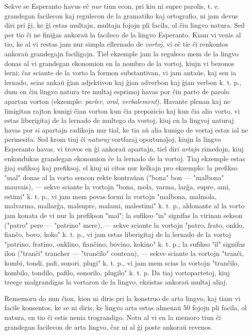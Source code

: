    Sekve se Esperanto havus e\^c {\sl nur} tiun econ, pri kiu ni supre
parolis, t. e. grandegan facilecon kaj regulecon de la gramatiko kaj
ortografio, ni jam devus diri pri \^gi, ke \^gi estas multajn,
multajn fojojn pli facila, ol \^ciu lingvo natura. Sed per tio \^ci
ne fini\^gas ankora\u u la facileco de la lingvo Esperanto. Kiam vi
venis al tio, ke al vi restas jam nur simpla ellernado de {\sl
vortoj}, vi e\^c tie \^ci renkontos ankora\u u grandegajn
faciligojn. Tiel ekzemple jam la reguleco mem de la lingvo donas al
vi grandegan ekonomion en la nombro de la vortoj, kiujn vi bezonos
lerni; \^car sciante de la vorto la formon substantivan, vi jam
anta\u ue, kaj sen ia lernado, scias anka\u u \^gian adjektivon kaj
\^gian adverbon kaj \^gian verbon k. t. p., dum en \^ciu lingvo
natura tre multaj esprimoj havas por \^ciu parto de parolo apartan
vorton (ekzemple: {\sl parler}, {\sl oral}, {\sl verbalement}).
Havante plenan kaj ne limigitan rajton kunigi \^cian vorton kun
\^cia prepozicio kaj kun \^cia alia vorto, vi estas liberigitaj de
la lernado de multego da vortoj, kiuj en la lingvoj naturaj havas
por si apartajn radikojn nur tial, ke tia a\u u alia kunigo de
vortaj estas ial ne permesita. Sed krom tiuj \^ci {\sl naturaj}
vortfaraj oportuna\^{\j}oj, kiujn la lingvo Esperanto havas, vi
trovos en \^gi ankora\u u apartajn, tiel diri {\sl artajn} rimedojn,
kiuj enkondukas grandegan ekonomion \^ce la lernado de la vortoj.
Tiaj ekzemple estas \^giaj sufiksoj kaj prefiksoj, el kiuj ni citos
nur kelkajn pro ekzemplo: la prefikso "mal" donas al la vorto
sencon rekte kontra\u uan ("bona" bon
--- "malbona" mauvais), --- sekve sciante la vortojn "bona, mola,
varma, lar\^ga, supre, ami, estimi" k. t. p., vi jam mem povas
formi la vortojn "malbona, malmola, malvarma, mallar\^ga, malsupre,
malami, malestimi" k. t. p., aldonante al la vorto jam konata de vi
nur la prefikson "mal"; la sufikso "in" signifas la virinan
sekson ("patro" pere --- "patrino" mere), --- sekve sciante la
vortojn "patro, frato, onklo, fian\^co, bovo, koko" k. t. p., vi
jam estas liberigitaj de la lernado de la vortoj "patrino, fratino,
onklino, fian\^cino, bovino, kokino" k. t. p.; la sufikso "il"
signifas ilon ("tran\^ci" trancher --- "tran\^cilo" couteau),
--- sekve sciante la vortojn "tran\^ci, kombi, tondi, pafi, sonori,
plugi" k. t. p., vi jam mem scias la vortojn "tran\^cilo, kombilo,
tondilo, pafilo, sonorilo, plugilo" k. t. p. Da tiaj vortopartetoj,
kiuj treege malgrandigas la vortaron de la lingvo, ekzistas ankora\u
u multaj aliaj.

   Rememoru do nun \^cion, kion ni diris pri la konstruo de arta lingvo,
kaj tiam vi facile konsentos, ke se ni diris, ke lingvo arta estas
almena\u u 50 fojojn pli facila, ol natura, en tio \^ci estis nenia
trograndigo. Notu al vi en la memoro tiun \^ci grandegan facilecon
de arta lingvo, \^car ni al \^gi poste ankora\u u revenos.

